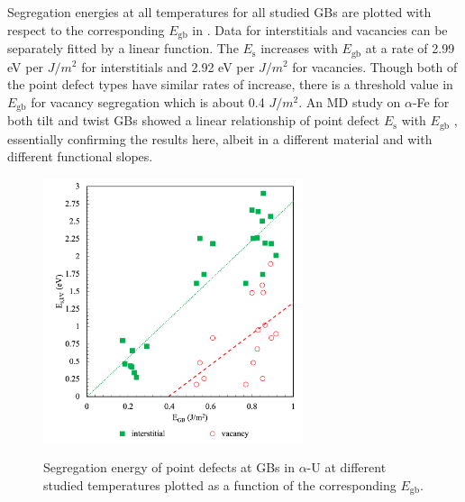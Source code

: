 \documentclass[review]{elsarticle}
\begin{document}
\par Segregation energies at all temperatures for all studied GBs are plotted with respect to the corresponding  $E_{\mathrm{gb}}$  in . Data for interstitials and vacancies can be separately fitted by a linear function. The $E_{\mathrm{s}}$ increases with  $E_{\mathrm{gb}}$  at a rate of 2.99 eV per $J/m{^2}$ for interstitials and 2.92 eV per $J/m^2$ for vacancies. Though both of the point defect types have similar rates of increase, there is a threshold value in $E_{\mathrm{gb}}$ for vacancy segregation which is about 0.4 $J/m^2$. An MD study on $\alpha$-Fe for both tilt and twist GBs showed a linear relationship of point defect $E_{\mathrm{s}}$ with $E_{\mathrm{gb}}$ \cite{tschopp2012probing}, essentially confirming the results here, albeit in a different material and with different functional slopes. 

\begin{figure}[h!]
\centering
\includegraphics[width = 3in]{SE_GB.png}\\
\caption{Segregation energy of point defects at GBs in $\alpha$-U at different studied temperatures plotted as a function of the corresponding $E_{\mathrm{gb}}$.}
\label{fig:SE_GB}
\end{figure}

\end{document}

